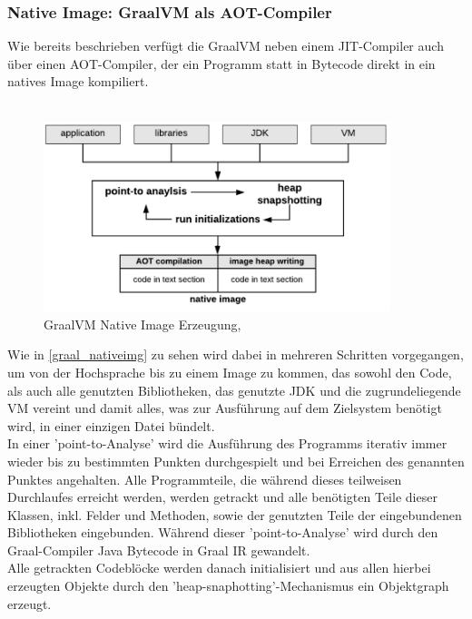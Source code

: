 \subsubsection{Native Image: GraalVM als AOT-Compiler} \label{graal_aot}
Wie bereits beschrieben verfügt die GraalVM neben einem \ac{JIT}-Compiler auch über einen \ac{AOT}-Compiler, der ein Programm statt in Bytecode direkt in ein natives Image kompiliert.\\
\\
\begin{figure}[ht]
    \begin{center}
        \includegraphics[width=0.9\textwidth]{assets/img/graal_nativeimg.PNG}
        \caption{GraalVM Native Image Erzeugung, \cite[Quelle: Sipek 2020]{Sipek_2020}}
        \label{graal_nativeimg}
    \end{center}
\end{figure}
Wie in \autoref{graal_nativeimg} zu sehen wird dabei in mehreren Schritten vorgegangen, um von der Hochsprache bis zu einem Image zu kommen, das sowohl den Code, als auch alle genutzten Bibliotheken, das genutzte \ac{JDK} und die zugrundeliegende VM vereint und damit alles, was zur Ausführung auf dem Zielsystem benötigt wird, in einer einzigen Datei bündelt.\\
In einer 'point-to-Analyse' wird die Ausführung des Programms iterativ immer wieder bis zu bestimmten Punkten durchgespielt und bei Erreichen des genannten Punktes angehalten. Alle Programmteile, die während dieses teilweisen Durchlaufes erreicht werden, werden getrackt und alle benötigten Teile dieser Klassen, inkl. Felder und Methoden, sowie der genutzten Teile der eingebundenen Bibliotheken eingebunden. Während dieser 'point-to-Analyse' wird durch den Graal-Compiler Java Bytecode in \ac{Graal IR} gewandelt.\\
Alle getrackten Codeblöcke werden danach initialisiert und aus allen hierbei erzeugten Objekte durch den 'heap-snaphotting'-Mechanismus ein Objektgraph erzeugt. \\
